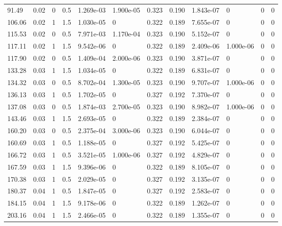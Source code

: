 \documentclass[preview]{standalone}
\begin{document}
{{\begin{tabular}{L{1.2cm}C{1.2cm} C{0.3cm}C{0.5cm} C{1.4cm}C{1.4cm} C{1.4cm}C{1.4cm} C{1.6cm}C{1.6cm} C{1.6cm}C{1.6cm}}
  91.49  &  0.02  & 0     & 0.5 &  1.269e-03  & 1.900e-05  &  0.323&   0.190& 1.843e-07 & 0   &  0 & 0  \\ 
  106.06  &  0.02  & 1     & 1.5 &  1.030e-05  & 0  &  0.322&   0.189& 7.655e-07 & 0   &  0 & 0  \\ 
  115.53  &  0.02  & 0     & 0.5 &  7.971e-03  & 1.170e-04  &  0.323&   0.190& 5.152e-07 & 0   &  0 & 0  \\ 
  117.11  &  0.02  & 1     & 1.5 &  9.542e-06  & 0  &  0.322&   0.189& 2.409e-06 & 1.000e-06   &  0 & 0  \\ 
  117.90  &  0.02  & 0     & 0.5 &  1.409e-04  & 2.000e-06  &  0.323&   0.190& 3.871e-07 & 0   &  0 & 0  \\ 
  133.28  &  0.03  & 1     & 1.5 &  1.034e-05  & 0  &  0.322&   0.189& 6.831e-07 & 0   &  0 & 0  \\ 
  134.32  &  0.03  & 0     & 0.5 &  8.702e-04  & 1.300e-05  &  0.323&   0.190& 9.707e-07 & 1.000e-06   &  0 & 0  \\ 
  136.13  &  0.03  & 1     & 0.5 &  1.702e-05  & 0  &  0.327&   0.192& 7.370e-07 & 0   &  0 & 0  \\ 
  137.08  &  0.03  & 0     & 0.5 &  1.874e-03  & 2.700e-05  &  0.323&   0.190& 8.982e-07 & 1.000e-06   &  0 & 0  \\ 
  143.46  &  0.03  & 1     & 1.5 &  2.693e-05  & 0  &  0.322&   0.189& 2.384e-07 & 0   &  0 & 0  \\ 
  160.20  &  0.03  & 0     & 0.5 &  2.375e-04  & 3.000e-06  &  0.323&   0.190& 6.044e-07 & 0   &  0 & 0  \\ 
  160.69  &  0.03  & 1     & 0.5 &  1.188e-05  & 0  &  0.327&   0.192& 5.425e-07 & 0   &  0 & 0  \\ 
  166.72  &  0.03  & 1     & 0.5 &  3.521e-05  & 1.000e-06  &  0.327&   0.192& 4.829e-07 & 0   &  0 & 0  \\ 
  167.59  &  0.03  & 1     & 1.5 &  9.396e-06  & 0  &  0.322&   0.189& 8.105e-07 & 0   &  0 & 0  \\ 
  170.38  &  0.03  & 1     & 0.5 &  2.029e-05  & 0  &  0.327&   0.192& 3.135e-07 & 0   &  0 & 0  \\ 
  180.37  &  0.04  & 1     & 0.5 &  1.847e-05  & 0  &  0.327&   0.192& 2.583e-07 & 0   &  0 & 0  \\ 
  184.15  &  0.04  & 1     & 1.5 &  9.178e-06  & 0  &  0.322&   0.189& 1.262e-07 & 0   &  0 & 0  \\ 
  203.16  &  0.04  & 1     & 1.5 &  2.466e-05  & 0  &  0.322&   0.189& 1.355e-07 & 0   &  0 & 0  \\ 

\end{tabular}}}
\end{document}
